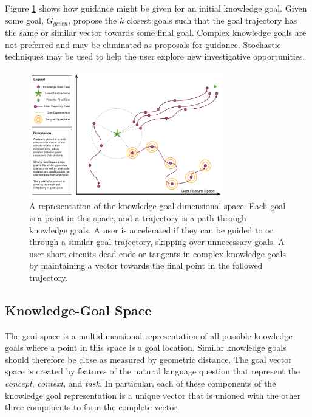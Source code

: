 \documentclass{llncs}
\begin{document}
Figure \ref{fig:representation} shows how guidance might be given for an initial knowledge goal. Given some goal, $G_{green}$, propose the $k$ closest goals such that the goal trajectory has the same or similar vector towards some final goal. Complex knowledge goals are not preferred and may be eliminated as proposals for guidance. Stochastic techniques may be used to help the user explore new investigative opportunities.

\begin{figure}{}
\centering
\includegraphics[width=0.75\textwidth]{figures/representation.png}
\caption{\label{fig:representation}A representation of the knowledge goal dimensional space. Each goal is a point in this space, and a trajectory is a path through knowledge goals. A user is accelerated if they can be guided to or through a similar goal trajectory, skipping over unnecessary goals. A user short-circuits dead ends or tangents in complex knowledge goals by maintaining a vector towards the final point in the followed trajectory.}
\end{figure} 

\subsection{Knowledge-Goal Space}

The goal space is a multidimensional representation of all possible knowledge goals where a point in this space is a goal location. Similar knowledge goals should therefore be close as measured by geometric distance. The goal vector space is created by features of the natural language question that represent the \textit{concept}, \textit{context}, and \textit{task}. In particular, each of these components of the knowledge goal representation is a unique vector that is unioned with the other three components to form the complete vector.
\end{document}
